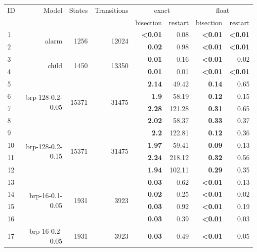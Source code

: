 \begin{longtable}{lrr@{\hskip 12pt}r@{\hskip 12pt}r@{\hskip 12pt}r@{\hskip 12pt}r@{\hskip 12pt}r}
\toprule
ID & Model & States & Transitions & \multicolumn{2}{c}{exact} & \multicolumn{2}{c}{float} \\
\cmidrule(lr){5-6}\cmidrule(lr){7-8}
 & & &  & bisection & restart & bisection & restart \\
\midrule
\endhead
1 & \multirow{2}{*}{alarm} & \multirow{2}{*}{1256} & \multirow{2}{*}{12024} & \textbf{<0.01} & 0.08 & \textbf{<0.01} & \textbf{<0.01} \\
2 &  &  &  & \textbf{0.02} & 0.98 & \textbf{<0.01} & \textbf{<0.01} \\
\cmidrule{5-8}
3 & \multirow{2}{*}{child} & \multirow{2}{*}{1450} & \multirow{2}{*}{13350} & \textbf{0.01} & 0.16 & \textbf{<0.01} & 0.02 \\
4 &  &  &  & \textbf{0.01} & 0.01 & \textbf{<0.01} & \textbf{<0.01} \\
\midrule
5 & \multirow{4}{*}{brp-128-0.2-0.05} & \multirow{4}{*}{15371} & \multirow{4}{*}{31475} & \textbf{2.14} & 49.42 & \textbf{0.14} & 0.65 \\
6 &  &  &  & \textbf{1.9} & 58.19 & \textbf{0.12} & 0.15 \\
7 &  &  &  & \textbf{2.28} & 121.28 & \textbf{0.31} & 0.65 \\
8 &  &  &  & \textbf{2.02} & 58.37 & \textbf{0.33} & 0.37 \\
\cmidrule{5-8}
9 & \multirow{4}{*}{brp-128-0.2-0.15} & \multirow{4}{*}{15371} & \multirow{4}{*}{31475} & \textbf{2.2} & 122.81 & \textbf{0.12} & 0.36 \\
10 &  &  &  & \textbf{1.97} & 59.41 & \textbf{0.09} & 0.13 \\
11 &  &  &  & \textbf{2.24} & 218.12 & \textbf{0.32} & 0.56 \\
12 &  &  &  & \textbf{1.94} & 102.11 & \textbf{0.29} & 0.35 \\
\cmidrule{5-8}
13 & \multirow{4}{*}{brp-16-0.1-0.05} & \multirow{4}{*}{1931} & \multirow{4}{*}{3923} & \textbf{0.03} & 0.62 & \textbf{<0.01} & 0.13 \\
14 &  &  &  & \textbf{0.02} & 0.25 & \textbf{<0.01} & 0.02 \\
15 &  &  &  & \textbf{0.03} & 0.92 & \textbf{<0.01} & 0.19 \\
16 &  &  &  & \textbf{0.03} & 0.39 & \textbf{<0.01} & 0.03 \\
\cmidrule{5-8}
17 & \multirow{4}{*}{brp-16-0.2-0.05} & \multirow{4}{*}{1931} & \multirow{4}{*}{3923} & \textbf{0.03} & 0.49 & \textbf{<0.01} & 0.05 \\

\end{longtable}
